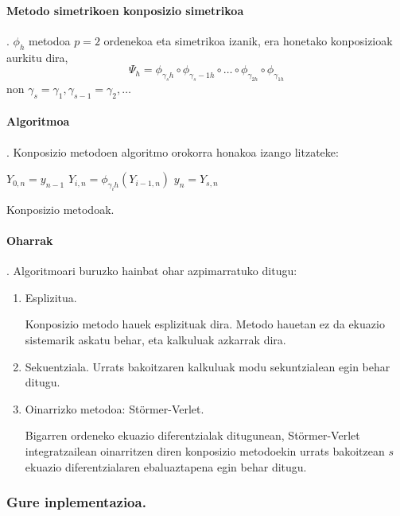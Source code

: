 \paragraph*{\textbf{Metodo simetrikoen konposizio simetrikoa}}.
$\phi_h$ metodoa $p=2$ ordenekoa eta simetrikoa izanik, era honetako konposizioak aurkitu dira,
\begin{equation}
\Psi_h=\phi_{\gamma_s h} \circ \phi_{\gamma_s-1 h} \circ \dots \circ \phi_{\gamma_{2 h}} \circ \phi_{\gamma_{1 h}} 
\end{equation}
non $\gamma_s=\gamma_1, \gamma_{s-1}=\gamma_2,\dots$ 

\paragraph*{\textbf{Algoritmoa}}.
Konposizio metodoen algoritmo orokorra honakoa izango litzateke:

\begin{algorithm}[H]
 \BlankLine
  {
   \BlankLine
    $Y_{0,n}=y_{n-1} $\;
    \BlankLine
   {
    \BlankLine 
    $Y_{i,n}=\phi_{\gamma_i h}(Y_{i-1,n})$\;
   }
   \BlankLine
    $y_{n}=Y_{s,n}$\;
   \BlankLine
 }
 \caption{Konposizio metodoak.}
\end{algorithm}
 
\paragraph*{Oharrak}.
Algoritmoari buruzko hainbat ohar azpimarratuko ditugu:
\begin{enumerate}
\item{Esplizitua.}

Konposizio metodo hauek esplizituak dira. Metodo hauetan ez da ekuazio sistemarik askatu behar, eta kalkuluak azkarrak dira. 

\item{Sekuentziala.}
Urrats bakoitzaren kalkuluak modu sekuntzialean egin behar ditugu.

\item{Oinarrizko metodoa: Störmer-Verlet.}

Bigarren ordeneko ekuazio diferentzialak ditugunean, Störmer-Verlet integratzailean oinarritzen diren konposizio metodoekin
urrats bakoitzean $s$ ekuazio diferentzialaren ebaluaztapena egin behar ditugu.

\end{enumerate}

\subsubsection{Gure inplementazioa.}

